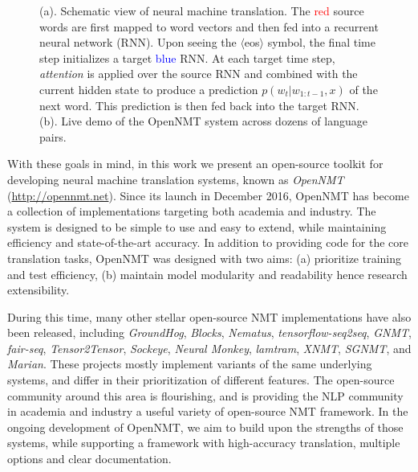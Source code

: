 \documentclass[]{article}
\begin{document}
\begin{figure}[t]
  \centering
  \caption{\small (a). Schematic view of neural machine translation. The \textcolor{red}{red} source words are first mapped to word vectors and then fed into a recurrent neural network (RNN). Upon seeing the $\langle$eos$\rangle$ symbol, the final time step initializes a target \textcolor{blue}{blue} RNN. At each target time step, \textit{attention} is applied over the source RNN and combined with the current hidden state to produce a prediction $p(w_t| w_{1: t-1}, x)$ of the next word. This prediction is then fed back into the target RNN. (b). Live demo of the OpenNMT system across dozens of language pairs.}
  \label{fig:ab}
\end{figure}

With these goals in mind, in this work we present an open-source toolkit for developing
neural machine translation systems, known as \textit{OpenNMT} (\url{http://opennmt.net}). Since its launch in December 2016, OpenNMT has become a collection of implementations targeting both academia and industry. The system is designed to be simple to use and easy to extend, while maintaining efficiency and state-of-the-art accuracy. In
addition to providing code for the core translation tasks, OpenNMT was
designed with two aims: (a) prioritize training and test
efficiency, (b) maintain model modularity and readability hence research extensibility.

During this time, many other stellar open-source NMT implementations
have also been released, including \textit{GroundHog},
\textit{Blocks}, \textit{Nematus}, \textit{tensorflow-seq2seq},
\textit{GNMT}, \textit{fair-seq},  \textit{Tensor2Tensor}, \textit{Sockeye},
\textit{Neural Monkey}, \textit{lamtram}, \textit{XNMT},
\textit{SGNMT}, and \textit{Marian}. These projects mostly implement
variants of the same underlying systems, and differ in their
prioritization of different features. The open-source community around
this area is flourishing, and is providing the NLP community in
academia and industry a useful variety of open-source NMT framework.
In the ongoing development of OpenNMT, we aim to build upon the
strengths of those systems, while supporting a framework with
high-accuracy translation, multiple options and clear documentation.
\end{document}
